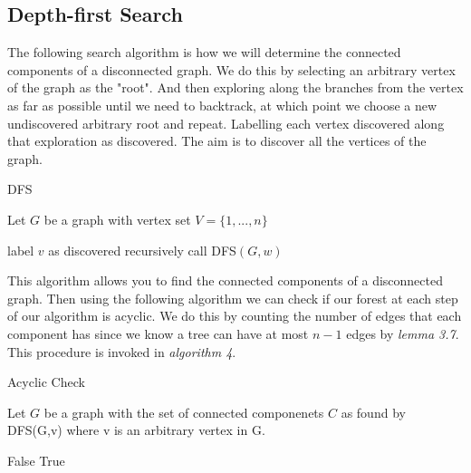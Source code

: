 \documentclass[../main.tex]{subfiles}
\begin{document}
\subsection{Depth-first Search}
The following search algorithm is how we will determine the connected components of a disconnected graph. We do this by selecting an arbitrary vertex of the graph as the "root". And then exploring along the branches from the vertex as far as possible until we need to backtrack, at which point we choose a new undiscovered arbitrary root and repeat. Labelling each vertex discovered along that exploration as discovered. The aim is to discover all the vertices of the graph.

\begin{algorithm}[H]
\caption{DFS}\label{dfs}
Let $G$ be a graph with vertex set $V = \{1,...,n\}$
\begin{algorithmic}[1]
\State label $v$ as discovered
	 	\State recursively call DFS$(G,w)$
	\EndIf
\EndFor
\EndProcedure
\end{algorithmic}
\end{algorithm}

\noindent This algorithm allows you to find the connected components of a disconnected graph. Then using the following algorithm we can check if our forest at each step of our algorithm is acyclic. We do this by counting the number of edges that each component has since we know a tree can have at most $n-1$ edges by \textit{lemma 3.7}. This procedure is invoked in \textit{algorithm 4}.

\begin{algorithm}[H]
\caption{Acyclic Check}\label{acyclic}
Let $G$ be a graph with the set of connected componenets $C$ as found by DFS(G,v) where v is an arbitrary vertex in G.
\begin{algorithmic}[1]
		\Return False
	\EndIf
\EndFor
	\Return True
\EndProcedure
\end{algorithmic}
\end{algorithm}
\end{document}
